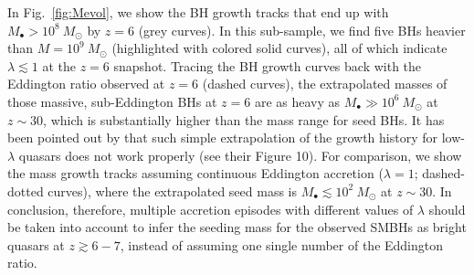 \documentclass[twocolumn, twocolappendix]{aastex63}
\newcommand{\Msun}{M_\odot}
\newcommand{\Mbh}{M_\bullet}
\newcommand{\red}[1]{\textcolor{red}{ #1}}
\newcommand{\blue}[1]{\textcolor{blue}{ #1}}
\begin{document}
\begin{CJK*}{UTF8}{gbsn}
In Fig.~\ref{fig:Mevol}, we show the BH growth tracks that end up with $M_\bullet>10^8~\Msun$ by $z=6$ (grey curves).
In this sub-sample, we find five BHs heavier than $M=10^9~\Msun$ (highlighted with colored solid curves),
all of which indicate $\lambda \lesssim 1$ at the  $z=6$ snapshot.
Tracing the BH growth curves back with the Eddington ratio observed at $z=6$ (dashed curves),
the extrapolated masses of those massive, sub-Eddington BHs at $z=6$ are as heavy as $\Mbh \gg 10^6~\Msun$ at $z\sim 30$,
which is substantially higher than the mass range for seed BHs.
%
It has been pointed out by \cite{2019ApJ...880...77O} that such simple extrapolation of the growth history for low-$\lambda$ quasars 
does not work properly (see their Figure 10).
For comparison, we show the mass growth tracks assuming continuous Eddington accretion ($\lambda=1$; dashed-dotted curves),
where the extrapolated seed mass is $\Mbh \lesssim 10^2~\Msun$ at $z\sim 30$.
In conclusion, therefore, multiple accretion episodes with different values of $\lambda$ should be taken into account 
to infer the seeding mass for the observed SMBHs as bright quasars at $z\gtrsim 6-7$,
instead of assuming one single number of the Eddington ratio.





\end{CJK*}
\end{document}

